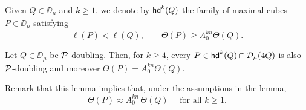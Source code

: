 Given $Q\in\DD_\mu$ and $k\geq1$, we denote by ${\mathsf{hd}}^k(Q)$ the family of maximal cubes $P\in\DD_\mu$ satisfying
\begin{equation}\label{a0tilde}
	\ell(P)<\ell(Q), \qquad \Theta(P)\geq  A_0^{kn}\Theta(Q).
\end{equation}



\vv
\begin{lemma}\label{lempdoubling}
	Let $Q\in\DD_\mu$ be ${\mathcal P}$-doubling. Then, for $k\geq4$, every $P\in{\mathsf{hd}}^k(Q)\cap{\mathcal D}_\mu(4Q)$ is also ${\mathcal P}$-doubling
	and moreover $\Theta(P)=A_0^{kn}\Theta(Q)$.
\end{lemma}

Remark that this lemma implies that, under the assumptions in the lemma,
$$\Theta(P)\approx A_0^{kn}\,\Theta(Q)\quad\mbox{ for all $k\geq 1$.}$$

